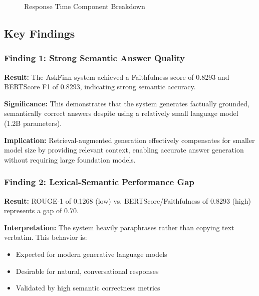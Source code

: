 \begin{figure}[htbp]
    \centering
    \caption{Response Time Component Breakdown}
    \label{fig:response_time}
\end{figure}

\subsection{Key Findings}
\label{subsec:key_findings}

\subsubsection{Finding 1: Strong Semantic Answer Quality}

\textbf{Result:} The AskFinn system achieved a Faithfulness score of 0.8293 and BERTScore F1 of 0.8293, indicating strong semantic accuracy.

\textbf{Significance:} This demonstrates that the system generates factually grounded, semantically correct answers despite using a relatively small language model (1.2B parameters).

\textbf{Implication:} Retrieval-augmented generation effectively compensates for smaller model size by providing relevant context, enabling accurate answer generation without requiring large foundation models.

\subsubsection{Finding 2: Lexical-Semantic Performance Gap}

\textbf{Result:} ROUGE-1 of 0.1268 (low) vs. BERTScore/Faithfulness of 0.8293 (high) represents a gap of 0.70.

\textbf{Interpretation:} The system heavily paraphrases rather than copying text verbatim. This behavior is:
\begin{itemize}
    \item Expected for modern generative language models
    \item Desirable for natural, conversational responses
    \item Validated by high semantic correctness metrics
\end{itemize}

